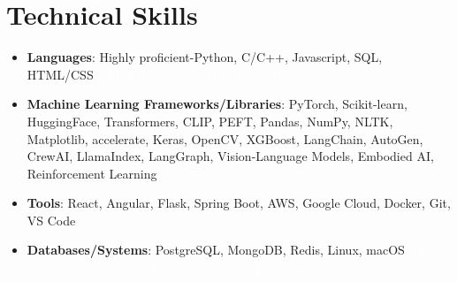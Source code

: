 \documentclass[letterpaper,10.5pt]{article}
\newcommand{\resumeItem}[2]{
  \item\small{
    \textbf{#1}{: #2 \vspace{-1pt}} %
  }
}
\newcommand{\resumeSubItem}[2]{\resumeItem{#1}{#2}\vspace{-1pt}} %
\newcommand{\resumeSubHeadingListStart}{\begin{itemize}[label=,leftmargin=*, parsep=3pt]}
\newcommand{\resumeSubHeadingListEnd}{\end{itemize}}
\begin{document}
\section{Technical Skills}
 \resumeSubHeadingListStart
    

    \resumeSubItem{Languages}{Highly proficient-Python, C/C++, Javascript, SQL, HTML/CSS \textcolor{white}{CVPR, Generative AI and NeurIPS}} %


\resumeSubItem{Machine Learning Frameworks/Libraries}{PyTorch, Scikit-learn, HuggingFace, Transformers, CLIP, PEFT, Pandas, NumPy, NLTK, Matplotlib, accelerate, Keras, OpenCV, XGBoost, LangChain, AutoGen, CrewAI, LlamaIndex, LangGraph, Vision-Language Models, Embodied AI, Reinforcement Learning}


\resumeSubItem{Tools}{React, Angular, Flask, Spring Boot, AWS, Google Cloud, Docker, Git, VS Code}

\resumeSubItem{Databases/Systems}{PostgreSQL, MongoDB, Redis, Linux, macOS \textcolor{white}{AI reasoning, symbolic and neuro-symbolic AI methods}} %


    
 \resumeSubHeadingListEnd





\end{document}

